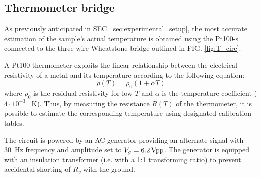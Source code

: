 \documentclass[rmp,10pt,onecolumn,fleqn,notitlepage]{revtex4-1}
\begin{document}
\subsection{Thermometer bridge}
\label{subsec:thermometer_bridge}

As previously anticipated in SEC. \ref{sec:experimental_setup}, the most accurate estimation of the sample's actual temperature is obtained using the Pt100-s connected to the three-wire Wheatstone bridge outlined in FIG. \ref{fig:T_circ}.

A Pt100 thermometer exploits the linear relationship between the electrical resistivity of a metal and its temperature according to the following equation:
\begin{equation}
    \rho(T) = \rho_0(1 + \alpha T)
\label{eq:ResTPt100}
\end{equation}
where $\rho_0$ is the residual resistivity for low $T$ and $\alpha$ is the temperature coefficient ($4 \cdot 10^{-3}$ \si{\per \kelvin}). Thus, by measuring the resistance $R(T)$ of the thermometer, it is possible to estimate the corresponding temperature using designated calibration tables.

The circuit is powered by an AC generator  providing an alternate signal with \SI{30}{\hertz} frequency and amplitude set to $V_g = 6.2\, \makebox{Vpp}$. The generator is equipped with an insulation transformer (i.e. with a 1:1 transforming ratio) to prevent accidental shorting of $R_v$ with the ground.
\end{document}
